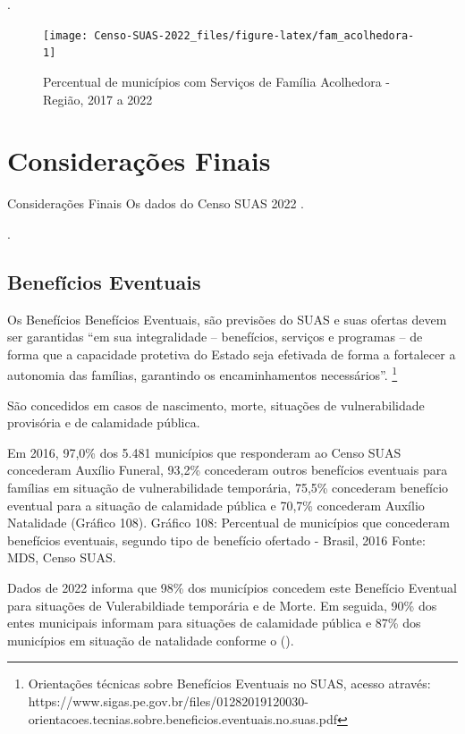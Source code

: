 \documentclass[
  brazilian]{report}
\begin{document}
.

\begin{figure}
\texttt{[image: Censo-SUAS-2022\_files/figure-latex/fam\_acolhedora-1]} \caption[Percentual de municípios com Serviços de Família Acolhedora - Região, 2017 a 2022]{Percentual de municípios com Serviços de Família Acolhedora - Região, 2017 a 2022}\label{fig:fam_acolhedora}
\end{figure}

\hypertarget{considerauxe7uxf5es-finais}{%
\chapter{Considerações Finais}\label{considerauxe7uxf5es-finais}}

Considerações Finais Os dados do Censo SUAS 2022 .

.

\hypertarget{benefuxedcios-eventuais}{%
\section{Benefícios Eventuais}\label{benefuxedcios-eventuais}}

Os Benefícios Benefícios Eventuais, são previsões do SUAS e suas ofertas
devem ser garantidas ``em sua integralidade -- benefícios, serviços e
programas -- de forma que a capacidade protetiva do Estado seja
efetivada de forma a fortalecer a autonomia das famílias, garantindo os
encaminhamentos necessários''.
\footnote{Orientações técnicas sobre Benefícios Eventuais no 
SUAS, acesso através: https://www.sigas.pe.gov.br/files/01282019120030-orientacoes.tecnias.sobre.beneficios.eventuais.no.suas.pdf}

São concedidos em casos de nascimento, morte, situações de
vulnerabilidade provisória e de calamidade pública.

Em 2016, 97,0\% dos 5.481 municípios que responderam ao Censo SUAS
concederam Auxílio Funeral, 93,2\% concederam outros benefícios
eventuais para famílias em situação de vulnerabilidade temporária,
75,5\% concederam benefício eventual para a situação de calamidade
pública e 70,7\% concederam Auxílio Natalidade (Gráfico 108). Gráfico
108: Percentual de municípios que concederam benefícios eventuais,
segundo tipo de benefício ofertado - Brasil, 2016 Fonte: MDS, Censo
SUAS.

Dados de 2022 informa que 98\% dos municípios concedem este Benefício
Eventual para situações de Vulerabildiade temporária e de Morte. Em
seguida, 90\% dos entes municipais informam para situações de calamidade
pública e 87\% dos municípios em situação de natalidade conforme o
().
\end{document}
